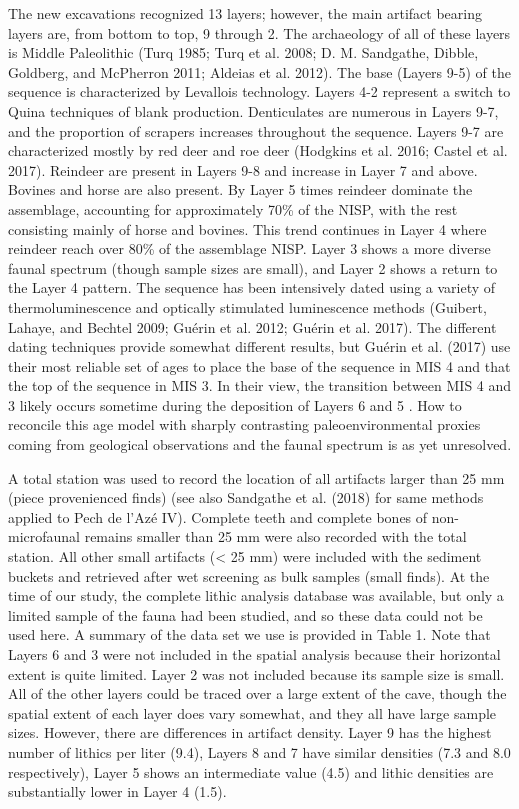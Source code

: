 \documentclass[smallextended]{svjour3}       %
\begin{document}
The new excavations recognized 13 layers; however, the main artifact
bearing layers are, from bottom to top, 9 through 2. The archaeology of
all of these layers is Middle Paleolithic (Turq 1985; Turq et al. 2008;
D. M. Sandgathe, Dibble, Goldberg, and McPherron 2011; Aldeias et al.
2012). The base (Layers 9-5) of the sequence is characterized by
Levallois technology. Layers 4-2 represent a switch to Quina techniques
of blank production. Denticulates are numerous in Layers 9-7, and the
proportion of scrapers increases throughout the sequence. Layers 9-7 are
characterized mostly by red deer and roe deer (Hodgkins et al. 2016;
Castel et al. 2017). Reindeer are present in Layers 9-8 and increase in
Layer 7 and above. Bovines and horse are also present. By Layer 5 times
reindeer dominate the assemblage, accounting for approximately 70\% of
the NISP, with the rest consisting mainly of horse and bovines. This
trend continues in Layer 4 where reindeer reach over 80\% of the
assemblage NISP. Layer 3 shows a more diverse faunal spectrum (though
sample sizes are small), and Layer 2 shows a return to the Layer 4
pattern. The sequence has been intensively dated using a variety of
thermoluminescence and optically stimulated luminescence methods
(Guibert, Lahaye, and Bechtel 2009; Guérin et al. 2012; Guérin et al.
2017). The different dating techniques provide somewhat different
results, but Guérin et al. (2017) use their most reliable set of ages to
place the base of the sequence in MIS 4 and that the top of the sequence
in MIS 3. In their view, the transition between MIS 4 and 3 likely
occurs sometime during the deposition of Layers 6 and 5 . How to
reconcile this age model with sharply contrasting paleoenvironmental
proxies coming from geological observations and the faunal spectrum is
as yet unresolved.

A total station was used to record the location of all artifacts larger
than 25 mm (piece provenienced finds) (see also Sandgathe et al. (2018)
for same methods applied to Pech de l'Azé IV). Complete teeth and
complete bones of non-microfaunal remains smaller than 25 mm were also
recorded with the total station. All other small artifacts (\textless{}
25 mm) were included with the sediment buckets and retrieved after wet
screening as bulk samples (small finds). At the time of our study, the
complete lithic analysis database was available, but only a limited
sample of the fauna had been studied, and so these data could not be
used here. A summary of the data set we use is provided in Table 1. Note
that Layers 6 and 3 were not included in the spatial analysis because
their horizontal extent is quite limited. Layer 2 was not included
because its sample size is small. All of the other layers could be
traced over a large extent of the cave, though the spatial extent of
each layer does vary somewhat, and they all have large sample sizes.
However, there are differences in artifact density. Layer 9 has the
highest number of lithics per liter (9.4), Layers 8 and 7 have similar
densities (7.3 and 8.0 respectively), Layer 5 shows an intermediate
value (4.5) and lithic densities are substantially lower in Layer 4
(1.5).
\end{document}
